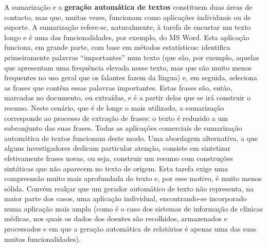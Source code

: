 \documentclass[]{../metanetpaper}
\begin{document}
\begin{multicols}{2}
A sumarização e a \textbf{geração automática de textos} constituem duas áreas de contacto, mas que, muitas vezes, funcionam como aplicações individuais ou de suporte. A sumarização refere-se, naturalmente, à tarefa de encurtar um texto longo e é uma das funcionalidades, por exemplo, do MS Word. Esta aplicação funciona, em grande parte, com base em métodos estatísticos: identifica primeiramente palavras “importantes” num texto (que são, por exemplo, aquelas que apresentam uma frequência elevada nesse texto, mas que são muito menos frequentes no uso geral que os falantes fazem da língua) e, em seguida, seleciona as frases que contêm essas palavras importantes. Estas frases são, então, marcadas no documento, ou extraídas, e é a partir delas que se irá construir o resumo. Neste cenário, que é de longe o mais utilizado, a sumarização cor\-res\-pon\-de ao processo de extração de frases: o texto é reduzido a um subconjunto das suas frases. Todas as aplicações comerciais de sumarização automática de textos funcionam deste modo. Uma abordagem alternativa, a que alguns investigadores dedicam particular atenção, consiste em sintetizar efetivamente frases novas, ou seja, construir um resumo com construções sintáticas que não aparecem no texto de origem. Esta tarefa exige uma compreensão muito mais aprofundada do texto e, por esse motivo, é muito menos sólida. Convém realçar que um gerador automático de texto não representa, na maior parte dos casos, uma aplicação individual, encontrando-se incorporado numa aplicação mais ampla (como é o caso dos sistemas de informação de clínicas médicas, nos quais os dados dos doentes são recolhidos, armazenados e processados e em que a geração automática de relatórios é apenas uma das suas muitas funcionalidades).



\end{multicols}
\end{document}
